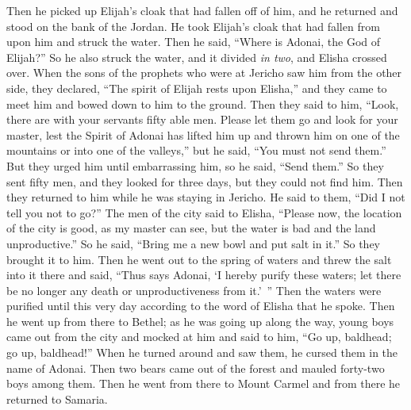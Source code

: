 \begin{biblechapter}
\verse Then he picked up Elijah’s cloak that had fallen off of him, and he returned and stood on the bank of the Jordan.
\verse He took Elijah’s cloak that had fallen from upon him and struck the water. Then he said, “Where is Adonai, the God of Elijah?” So he also struck the water, and it divided \textit{in two}, and Elisha crossed over.
 When the sons of the prophets who were at Jericho saw him from the other side, they declared, “The spirit of Elijah rests upon Elisha,” and they came to meet him and bowed down to him to the ground.
\verse Then they said to him, “Look, there are with your servants fifty able men. Please let them go and look for your master, lest the Spirit of Adonai has lifted him up and thrown him on one of the mountains or into one of the valleys,” but he said, “You must not send them.”
\verse But they urged him until embarrassing him, so he said, “Send them.” So they sent fifty men, and they looked for three days, but they could not find him.
\verse Then they returned to him while he was staying in Jericho. He said to them, “Did I not tell you not to go?”
\verse The men of the city said to Elisha, “Please now, the location of the city is good, as my master can see, but the water is bad and the land unproductive.”
\verse So he said, “Bring me a new bowl and put salt in it.” So they brought it to him.
\verse Then he went out to the spring of waters and threw the salt into it there and said, “Thus says Adonai, ‘I hereby purify these waters; let there be no longer any death or unproductiveness from it.’ ”
\verse Then the waters were purified until this very day according to the word of Elisha that he spoke.
\verse Then he went up from there to Bethel; as he was going up along the way, young boys came out from the city and mocked at him and said to him, “Go up, baldhead; go up, baldhead!”
\verse When he turned around and saw them, he cursed them in the name of Adonai. Then two bears came out of the forest and mauled forty-two boys among them.
\verse Then he went from there to Mount Carmel and from there he returned to Samaria.
\end{biblechapter}

